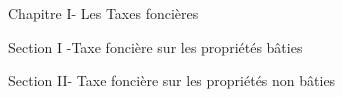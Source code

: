 Chapitre I- Les Taxes foncières 

	Section I -Taxe foncière sur les propriétés bâties 

	Section II- Taxe foncière sur les propriétés non bâties 
